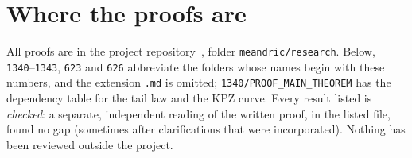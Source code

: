 \section{Where the proofs are}\label{app:repo}

All proofs are in the project repository~\cite{Repo}, folder \texttt{meandric/research}. Below,
\texttt{1340}--\texttt{1343}, \texttt{623} and \texttt{626} abbreviate the folders whose names begin
with these numbers, and the extension \texttt{.md} is omitted; \texttt{1340/PROOF\_MAIN\_THEOREM} has
the dependency table for the tail law and the KPZ curve. Every result listed is \emph{checked}: a
separate, independent reading of the written proof, in the listed file, found no gap (sometimes
after clarifications that were incorporated). Nothing has been reviewed outside the project.

